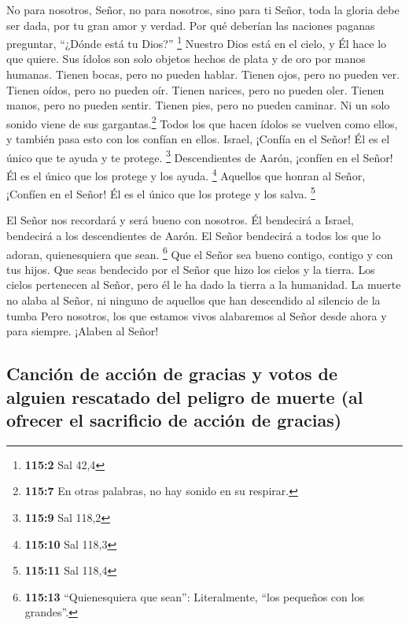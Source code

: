  No para nosotros, Señor, no para nosotros, sino para ti
Señor, toda la gloria debe ser dada, por tu gran amor y verdad.
 Por qué deberían las naciones paganas preguntar, ``¿Dónde
está tu Dios?'' \footnote{\textbf{115:2} Sal 42,4} 
Nuestro Dios está en el cielo, y Él hace lo que quiere. 
Sus ídolos son solo objetos hechos de plata y de oro por manos humanas.
 Tienen bocas, pero no pueden hablar. Tienen ojos, pero no
pueden ver.  Tienen oídos, pero no pueden oír. Tienen
narices, pero no pueden oler.  Tienen manos, pero no
pueden sentir. Tienen pies, pero no pueden caminar. Ni un solo sonido
viene de sus gargantas.\footnote{\textbf{115:7} En otras palabras, no
  hay sonido en su respirar.}  Todos los que hacen ídolos
se vuelven como ellos, y también pasa esto con los confían en ellos.
 Israel, ¡Confía en el Señor! Él es el único que te ayuda
y te protege. \footnote{\textbf{115:9} Sal 118,2} 
Descendientes de Aarón, ¡confíen en el Señor! Él es el único que los
protege y los ayuda. \footnote{\textbf{115:10} Sal 118,3}
 Aquellos que honran al Señor, ¡Confíen en el Señor! Él
es el único que los protege y los salva. \footnote{\textbf{115:11} Sal
  118,4}

 El Señor nos recordará y será bueno con nosotros. Él
bendecirá a Israel, bendecirá a los descendientes de Aarón.
 El Señor bendecirá a todos los que lo adoran,
quienesquiera que sean. \footnote{\textbf{115:13} ``Quienesquiera que
  sean'': Literalmente, ``los pequeños con los grandes''.}
 Que el Señor sea bueno contigo, contigo y con tus hijos.
 Que seas bendecido por el Señor que hizo los cielos y la
tierra.  Los cielos pertenecen al Señor, pero él le ha
dado la tierra a la humanidad.  La muerte no alaba al
Señor, ni ninguno de aquellos que han descendido al silencio de la tumba
 Pero nosotros, los que estamos vivos alabaremos al Señor
desde ahora y para siempre. ¡Alaben al Señor!

\hypertarget{canciuxf3n-de-acciuxf3n-de-gracias-y-votos-de-alguien-rescatado-del-peligro-de-muerte-al-ofrecer-el-sacrificio-de-acciuxf3n-de-gracias}{%
\subsection{Canción de acción de gracias y votos de alguien rescatado
del peligro de muerte (al ofrecer el sacrificio de acción de
gracias)}\label{canciuxf3n-de-acciuxf3n-de-gracias-y-votos-de-alguien-rescatado-del-peligro-de-muerte-al-ofrecer-el-sacrificio-de-acciuxf3n-de-gracias}}

